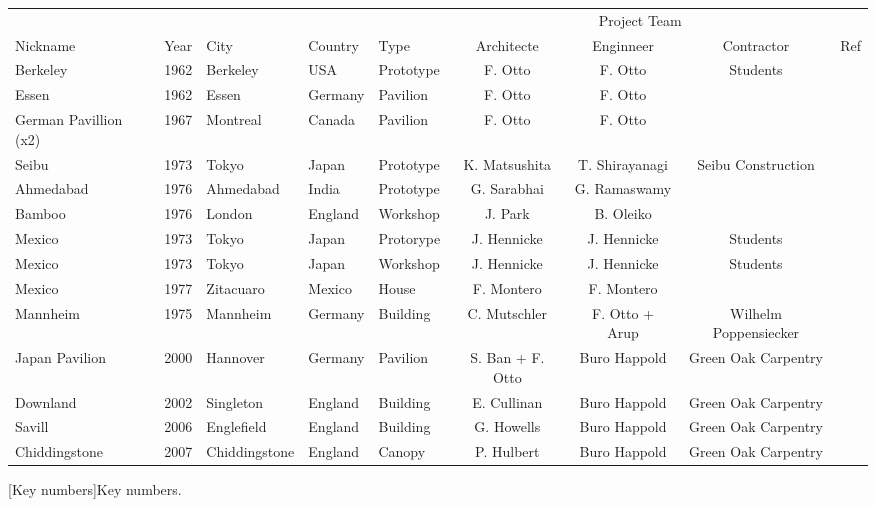 \begin{landscape}%
\begin{table}[p]
\centering\small
{}
 	\begin{tabularx}{23cm}{@{}X llll ccc r@{}}
	\toprule
					&		&				&			&			& \multicolumn{3}{c}{Project Team}										& 	\\ \cmidrule(l){6-8}
 	Nickname			& Year	& City			& Country		& Type		& Architecte 			& Enginneer				& Contractor			& Ref \\ 
	\midrule
	Berkeley			& 1962	& Berkeley		& USA		& Prototype	& F. Otto	 			& F. Otto					& Students			& \cite{Otto1974} \\
	Essen			& 1962	& Essen			& Germany	& Pavilion		& F. Otto	 			& F. Otto					& 					& \cite{Otto1974} \\
	German Pavillion (x2)& 1967	& Montreal		& Canada		& Pavilion		& F. Otto	 			& F. Otto					& 					& \cite{Otto1974} \\
	Seibu			& 1973	& Tokyo			& Japan		& Prototype	& K. Matsushita	 		& T. Shirayanagi			& Seibu Construction	& \cite{Otto1976} \\
	Ahmedabad		& 1976	& Ahmedabad		& India		& Prototype	& G. Sarabhai 			& G. Ramaswamy			& 					& \cite{Otto1976} \\
	Bamboo			& 1976	& London			& England		& Workshop	& J. Park 				& B. Oleiko				& 					& \cite{Otto1976} \\

	Mexico			& 1973	& Tokyo			& Japan		& Protorype	& J. Hennicke			& J. Hennicke				& Students			& \cite{Otto1976} \\
	Mexico			& 1973	& Tokyo			& Japan		& Workshop	& J. Hennicke			& J. Hennicke				& Students			& \cite{Otto1976} \\

	Mexico			& 1977	& Zitacuaro		& Mexico		& House		& F. Montero 			& F. Montero				& 					& \cite{Otto1976} \\

	\midrule
	Mannheim			& 1975	& Mannheim		& Germany	& Building		& C. Mutschler	 		& F. Otto + Arup			& Wilhelm Poppensiecker	& \cite{} \\
	Japan Pavilion		& 2000	& Hannover		& Germany	& Pavilion		& S. Ban + F. Otto		& Buro Happold 			& Green Oak Carpentry	& \cite{} \\
	Downland			& 2002	& Singleton		& England		& Building		& E. Cullinan	 		& Buro Happold			& Green Oak Carpentry	& \cite{} \\
	Savill			& 2006	& Englefield		& England		& Building		& G. Howells			& Buro Happold			& Green Oak Carpentry	& \cite{} \\
	Chiddingstone		& 2007	& Chiddingstone	& England		& Canopy		& P. Hulbert			& Buro Happold			& Green Oak Carpentry	& \cite{} \\
	
	\bottomrule
 	\end{tabularx}
[Key numbers]{Key numbers.}
\end{table}
\end{landscape}%




